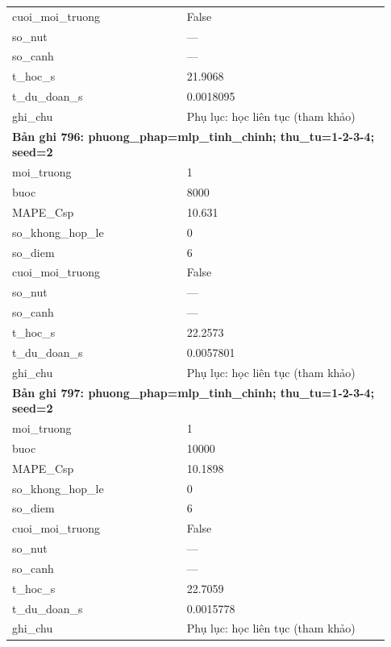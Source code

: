 \begin{longtable}{p{0.43\linewidth}p{0.50\linewidth}}
cuoi\_\allowbreak moi\_\allowbreak truong & False \\
so\_\allowbreak nut & — \\
so\_\allowbreak canh & — \\
t\_\allowbreak hoc\_\allowbreak s & 21.9068 \\
t\_\allowbreak du\_\allowbreak doan\_\allowbreak s & 0.0018095 \\
ghi\_\allowbreak chu & Phụ lục: học liên tục (tham khảo) \\
\midrule
\multicolumn{2}{p{0.95\linewidth}}{\textbf{Bản ghi 796: phuong\_phap=mlp\_tinh\_chinh; thu\_tu=1-2-3-4; seed=2}} \\
moi\_\allowbreak truong & 1 \\
buoc & 8000 \\
MAPE\_\allowbreak Csp & 10.631 \\
so\_\allowbreak khong\_\allowbreak hop\_\allowbreak le & 0 \\
so\_\allowbreak diem & 6 \\
cuoi\_\allowbreak moi\_\allowbreak truong & False \\
so\_\allowbreak nut & — \\
so\_\allowbreak canh & — \\
t\_\allowbreak hoc\_\allowbreak s & 22.2573 \\
t\_\allowbreak du\_\allowbreak doan\_\allowbreak s & 0.0057801 \\
ghi\_\allowbreak chu & Phụ lục: học liên tục (tham khảo) \\
\midrule
\multicolumn{2}{p{0.95\linewidth}}{\textbf{Bản ghi 797: phuong\_phap=mlp\_tinh\_chinh; thu\_tu=1-2-3-4; seed=2}} \\
moi\_\allowbreak truong & 1 \\
buoc & 10000 \\
MAPE\_\allowbreak Csp & 10.1898 \\
so\_\allowbreak khong\_\allowbreak hop\_\allowbreak le & 0 \\
so\_\allowbreak diem & 6 \\
cuoi\_\allowbreak moi\_\allowbreak truong & False \\
so\_\allowbreak nut & — \\
so\_\allowbreak canh & — \\
t\_\allowbreak hoc\_\allowbreak s & 22.7059 \\
t\_\allowbreak du\_\allowbreak doan\_\allowbreak s & 0.0015778 \\
ghi\_\allowbreak chu & Phụ lục: học liên tục (tham khảo) \\

\end{longtable}
